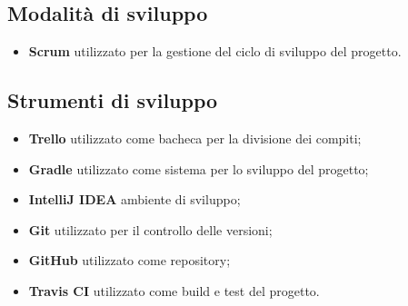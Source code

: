 \documentclass[12pt, italian]{article}
\begin{document}
\subsection{Modalità di sviluppo}
\begin{itemize}
	\item \textbf{Scrum} utilizzato per la gestione del ciclo di sviluppo del progetto.
\end{itemize}
\subsection{Strumenti di sviluppo}
\begin{itemize}
	\item \textbf{Trello} utilizzato come bacheca per la divisione dei compiti;
	\item \textbf{Gradle} utilizzato come sistema per lo sviluppo del progetto;
	\item \textbf{IntelliJ IDEA} ambiente di sviluppo;
	\item \textbf{Git} utilizzato per il controllo delle versioni;
	\item \textbf{GitHub} utilizzato come repository;
	\item \textbf{Travis CI} utilizzato come build e test del progetto.
\end{itemize}
\end{document}
